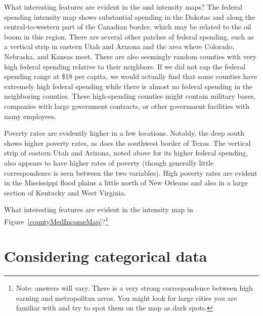 \begin{example}{What interesting features are evident in the  and  intensity maps?}
The federal spending intensity map shows substantial spending in the Dakotas and along the central-to-western part of the Canadian border, which may be related to the oil boom in this region. There are several other patches of federal spending, such as a vertical strip in eastern Utah and Arizona and the area where Colorado, Nebraska, and Kansas meet. There are also seemingly random counties with very high federal spending relative to their neighbors. If we did not cap the federal spending range at \$18 per capita, we would actually find that some counties have extremely high federal spending while there is almost no federal spending in the neighboring counties. These high-spending counties might contain military bases, companies with large government contracts, or other government facilities with many employees.

Poverty rates are evidently higher in a few locations. Notably, the deep south shows higher poverty rates, as does the southwest border of Texas. The vertical strip of eastern Utah and Arizona, noted above for its higher federal spending, also appears to have higher rates of poverty (though generally little correspondence is seen between the two variables).  High poverty rates are evident in the Mississippi flood plains a little north of New Orleans and also in a large section of Kentucky and West Virginia.
\end{example}

\begin{exercise}
What interesting features are evident in the  intensity map in Figure~\ref{countyMedIncomeMap}?\footnote{Note: answers will vary. There is a very strong correspondence between high earning and metropolitan areas. You might look for large cities you are familiar with and try to spot them on the map as dark spots.}
\end{exercise}




\textC{\newpage}

\section[Considering categorical data]{Considering categorical data }
\label{categoricalData}

